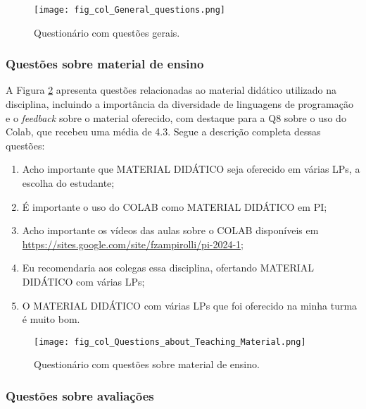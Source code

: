 \begin{figure}[!ht]
    \centering
    \texttt{[image: fig\_col\_General\_questions.png]}
     \caption{Questionário com questões gerais.}
  \label{fig:fig_col_General_questions}
\end{figure}

\subsubsection{Questões sobre material de ensino}

A Figura \ref{fig:fig_col_Questions_about_Teaching_Material} apresenta questões relacionadas ao material didático utilizado na disciplina, incluindo a importância da diversidade de linguagens de programação e o \textit{feedback} sobre o material oferecido, com destaque para a Q8 sobre o uso do Colab, que recebeu uma média de 4.3. Segue a descrição completa dessas questões:

\begin{enumerate}[label=\textbf{Q\arabic*.}, itemsep=0pt, parsep=0pt, topsep=0pt, leftmargin=*, before=\ttfamily, after=\normalfont]
    \fontsize{9}{11}\selectfont
    \setcounter{enumi}{6} %
    \item Acho importante que MATERIAL DIDÁTICO seja oferecido em várias LPs, a escolha do estudante;
    \item É importante o uso do COLAB como MATERIAL DIDÁTICO em PI;
    \item Acho importante os vídeos das aulas sobre o COLAB disponíveis em \url{https://sites.google.com/site/fzampirolli/pi-2024-1};
    \item Eu recomendaria aos colegas essa disciplina, ofertando MATERIAL DIDÁTICO com várias LPs;
    \item O MATERIAL DIDÁTICO com várias LPs que foi oferecido na minha turma é muito bom.
\end{enumerate}

\begin{figure}[!ht]
    \centering
    \texttt{[image: fig\_col\_Questions\_about\_Teaching\_Material.png]}
     \caption{Questionário com questões sobre material de ensino.}
  \label{fig:fig_col_Questions_about_Teaching_Material}
\end{figure}


\subsubsection{Questões sobre avaliações}

